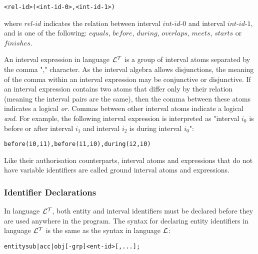 \documentclass[11pt]{report}
\newenvironment{vverbatim}
{
  \begin{alltt}
}
{
    \vspace{-\baselineskip}
  \end{alltt}
}
\begin{document}
\begin{itemize}
              \begin{vverbatim}
  <rel-id>(<int-id-0>, <int-id-1>)
              \end{vverbatim}

              where $rel$-$id$ indicates the relation between interval
              $int$-$id$-$0$ and interval $int$-$id$-$1$, and is one of the
              following: $equals$, $before$, $during$, $overlaps$, $meets$,
              $starts$ or $finishes$.

              An interval expression in language ${\cal L^T}$ is a group
              of interval atoms separated by the comma "," character. As the
              interval algebra allows disjunctions, the meaning of the comma
              within an interval expression may be conjunctive or disjunctive.
              If an interval expression contains two atoms that differ only by
              their relation (meaning the interval pairs are the same), then
              the comma between these atoms indicates a logical {\em or}.
              Commas between other interval atoms indicate a logical {\em and}.
              For example, the following interval expression is interpreted as
              "interval $i_0$ is before or after interval $i_1$ and interval
              $i_2$ is during interval $i_0$":

              \begin{vverbatim}
  before(i0, i1), before(i1, i0), during(i2, i0)
              \end{vverbatim}

              Like their authorisation counterparts, interval atoms and
              expressions that do not have variable identifiers are called
              ground interval atoms and expressions.

          \end{itemize}

        \subsubsection{Identifier Declarations}

          In language ${\cal L^T}$, both entity and interval identifiers must
          be declared before they are used anywhere in the program. The syntax
          for declaring entity identifiers in language ${\cal L^T}$ is the same
          as the syntax in language ${\cal L}$:

          \begin{vverbatim}
  entity sub|acc|obj[-grp] <ent-id>[, ...];
          \end{vverbatim}
\end{document}

